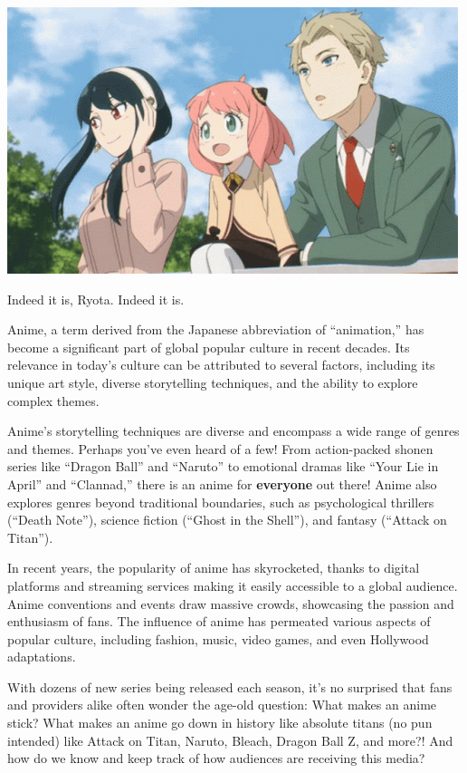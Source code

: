 \documentclass[
]{article}
\author{Breanna Richards}
\date{}
\begin{document}
\includegraphics{./img/spy-family.gif}

Indeed it is, Ryota. Indeed it is.

Anime, a term derived from the Japanese abbreviation of ``animation,''
has become a significant part of global popular culture in recent
decades. Its relevance in today's culture can be attributed to several
factors, including its unique art style, diverse storytelling
techniques, and the ability to explore complex themes.

Anime's storytelling techniques are diverse and encompass a wide range
of genres and themes. Perhaps you've even heard of a few! From
action-packed shonen series like ``Dragon Ball'' and ``Naruto'' to
emotional dramas like ``Your Lie in April'' and ``Clannad,'' there is an
anime for \textbf{everyone} out there! Anime also explores genres beyond
traditional boundaries, such as psychological thrillers (``Death
Note''), science fiction (``Ghost in the Shell''), and fantasy (``Attack
on Titan'').

In recent years, the popularity of anime has skyrocketed, thanks to
digital platforms and streaming services making it easily accessible to
a global audience. Anime conventions and events draw massive crowds,
showcasing the passion and enthusiasm of fans. The influence of anime
has permeated various aspects of popular culture, including fashion,
music, video games, and even Hollywood adaptations.

With dozens of new series being released each season, it's no surprised
that fans and providers alike often wonder the age-old question: What
makes an anime stick? What makes an anime go down in history like
absolute titans (no pun intended) like Attack on Titan, Naruto, Bleach,
Dragon Ball Z, and more?! And how do we know and keep track of how
audiences are receiving this media?
\end{document}
